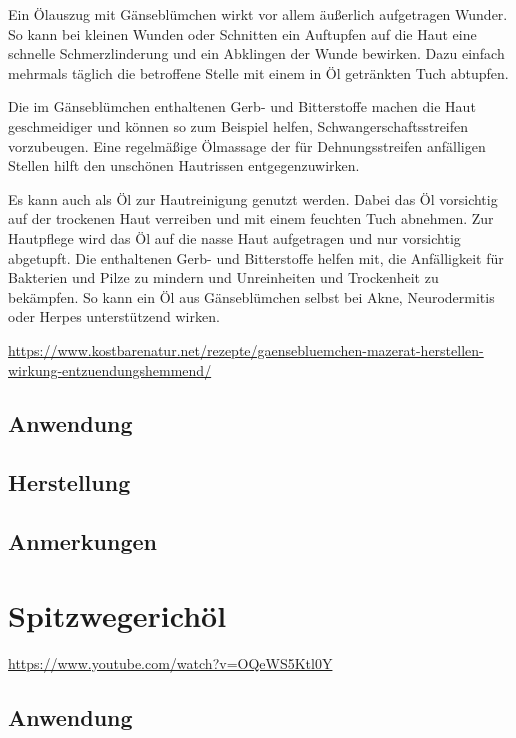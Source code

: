 Ein Ölauszug mit Gänseblümchen wirkt vor allem äußerlich aufgetragen Wunder. So kann bei kleinen Wunden oder Schnitten ein Auftupfen auf die Haut eine schnelle Schmerzlinderung und ein Abklingen der Wunde bewirken. Dazu einfach mehrmals täglich die betroffene Stelle mit einem in Öl getränkten Tuch abtupfen.

Die im Gänseblümchen enthaltenen Gerb- und Bitterstoffe machen die Haut geschmeidiger und können so zum Beispiel helfen, Schwangerschaftsstreifen vorzubeugen. Eine regelmäßige Ölmassage der für Dehnungsstreifen anfälligen Stellen hilft den unschönen Hautrissen entgegenzuwirken.

Es kann auch als Öl zur Hautreinigung genutzt werden. Dabei das Öl vorsichtig auf der trockenen Haut verreiben und mit einem feuchten Tuch abnehmen. Zur Hautpflege wird das Öl auf die nasse Haut aufgetragen und nur vorsichtig abgetupft. Die enthaltenen Gerb- und Bitterstoffe helfen mit, die Anfälligkeit für Bakterien und Pilze zu mindern und Unreinheiten und Trockenheit zu bekämpfen. So kann ein Öl aus Gänseblümchen selbst bei Akne, Neurodermitis oder Herpes unterstützend wirken.

\url{https://www.kostbarenatur.net/rezepte/gaensebluemchen-mazerat-herstellen-wirkung-entzuendungshemmend/}

\subsection{Anwendung}

\subsection{Herstellung}

\subsection{Anmerkungen}






\section{Spitzwegerichöl}


\cite{swrhandwerkskunst} 

\url{https://www.youtube.com/watch?v=OQeWS5Ktl0Y}

\subsection{Anwendung}

